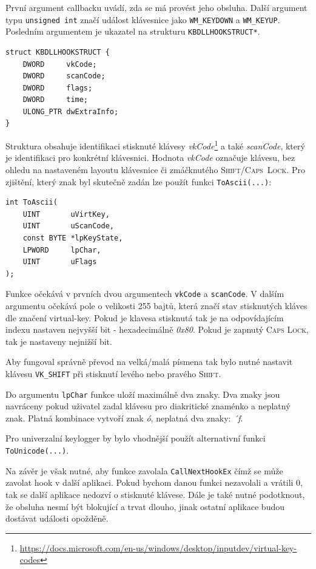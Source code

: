 \documentclass[12pt]{article}
\begin{document}
První argument callbacku uvádí, zda se má provést jeho obsluha.
Další argument typu \texttt{unsigned int} značí událost klávesnice jako \texttt{WM_KEYDOWN} a \texttt{WM_KEYUP}.
Posledním argumentem je ukazatel na strukturu \texttt{KBDLLHOOKSTRUCT*}.
\begin{verbatim}
struct KBDLLHOOKSTRUCT {
	DWORD     vkCode;
	DWORD     scanCode;
	DWORD     flags;
	DWORD     time;
	ULONG_PTR dwExtraInfo;
}
\end{verbatim}
Struktura obsahuje identifikaci stisknuté klávesy \textit{vkCode}\footnote{\url{https://docs.microsoft.com/en-us/windows/desktop/inputdev/virtual-key-codes}} a také \textit{scanCode}, který je identifikaci pro konkrétní klávesnici.
Hodnota \textit{vkCode} označuje klávesu, bez ohledu na nastaveném layoutu klávesnice či zmáčknutého \mbox{\textsc{Shift/Caps Lock}}.
Pro zjištění, který znak byl skutečně zadán lze použít funkci \texttt{ToAscii(...)}:
\begin{verbatim}
int ToAscii(
	UINT       uVirtKey,
	UINT       uScanCode,
	const BYTE *lpKeyState,
	LPWORD     lpChar,
	UINT       uFlags
);
\end{verbatim}
Funkce očekává v prvních dvou argumentech \texttt{vkCode} a \texttt{scanCode}.
V dalším argumentu očekává pole o velikosti 255 bajtů, která značí stav stisknutých kláves dle značení virtual-key.
Pokud je klavesa stisknutá tak je na odpovídajícím indexu nastaven nejvyšší bit - hexadecimálně \textit{0x80}.
Pokud je zapnutý \textsc{Caps Lock}, tak je nastaveny nejnižší bit.

Aby fungoval správně převod na velká/malá písmena tak bylo nutné nastavit klávesu \texttt{VK_SHIFT} při stisknutí levého nebo pravého \textsc{Shift}.

Do argumentu \texttt{lpChar} funkce uloží maximálně dva znaky.
Dva znaky jsou navráceny pokud uživatel zadal klávesu pro diakritické znaménko a neplatný znak. Platná kombinace vytvoří znak \textit{ó}, neplatná dva znaky: \textit{´f}.

Pro univerzalní keylogger by bylo vhodnější použít alternativní funkci \texttt{ToUnicode(...)}.

Na závěr je však nutné, aby funkce zavolala \texttt{CallNextHookEx} čímž se může zavolat hook v další aplikaci.
Pokud bychom danou funkci nezavolali a vrátili 0, tak se další aplikace nedozví o stisknuté klávese.
Dále je také nutné podotknout, že obsluha nesmí být blokující a trvat dlouho, jinak ostatní aplikace budou dostávat události opožděně.
\end{document}
